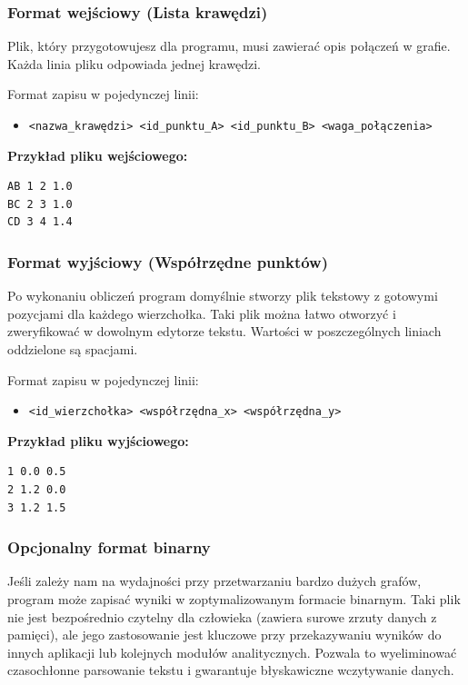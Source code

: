 \documentclass[12pt,a4paper]{article}
\begin{document}
\subsubsection{Format wejściowy (Lista krawędzi)}
Plik, który przygotowujesz dla programu, musi zawierać opis połączeń w grafie. Każda linia pliku odpowiada jednej krawędzi.

Format zapisu w pojedynczej linii:
\begin{itemize}
    \item \texttt{<nazwa\_krawędzi> <id\_punktu\_A> <id\_punktu\_B> <waga\_połączenia>}
\end{itemize}

\textbf{Przykład pliku wejściowego:}
\begin{verbatim}
AB 1 2 1.0
BC 2 3 1.0
CD 3 4 1.4
\end{verbatim}

\subsubsection{Format wyjściowy (Współrzędne punktów)}
Po wykonaniu obliczeń program domyślnie stworzy plik tekstowy z gotowymi pozycjami dla każdego wierzchołka. Taki plik można łatwo otworzyć i zweryfikować w dowolnym edytorze tekstu. Wartości w poszczególnych liniach oddzielone są spacjami.

Format zapisu w pojedynczej linii:
\begin{itemize}
    \item \texttt{<id\_wierzchołka> <współrzędna\_x> <współrzędna\_y>}
\end{itemize}

\textbf{Przykład pliku wyjściowego:}
\begin{verbatim}
1 0.0 0.5
2 1.2 0.0
3 1.2 1.5
\end{verbatim}

\subsubsection{Opcjonalny format binarny}
Jeśli zależy nam na wydajności przy przetwarzaniu bardzo dużych grafów, program może zapisać wyniki w zoptymalizowanym formacie binarnym. Taki plik nie jest bezpośrednio czytelny dla człowieka (zawiera surowe zrzuty danych z pamięci), ale jego zastosowanie jest kluczowe przy przekazywaniu wyników do innych aplikacji lub kolejnych modułów analitycznych. Pozwala to wyeliminować czasochłonne parsowanie tekstu i gwarantuje błyskawiczne wczytywanie danych.
\end{document}
